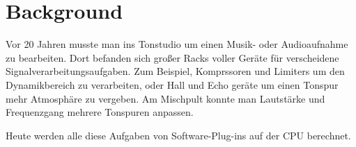 \section{Background}

Vor 20 Jahren musste man ins Tonstudio um einen Musik- oder Audioaufnahme zu bearbeiten. Dort befanden sich großer Racks voller Geräte für verscheidene Signalverarbeitungsaufgaben. Zum Beispiel, Komprssoren und Limiters um den Dynamikbereich zu verarbeiten, oder Hall und Echo geräte um einen Tonspur mehr Atmosphäre zu vergeben. Am Mischpult konnte man Lautstärke und Frequenzgang mehrere Tonspuren anpassen.

Heute werden alle diese Aufgaben von Software-Plug-ins auf der CPU berechnet.